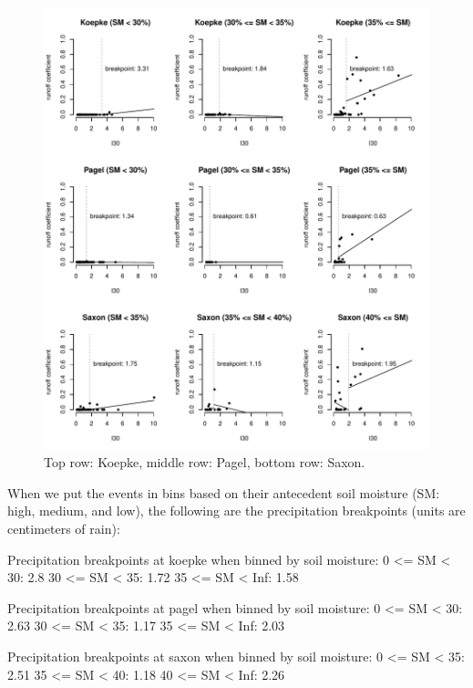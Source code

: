 \documentclass[12pt]{article}
\begin{document}
\begin{figure}
    \begin{center}
\includegraphics{runoff-I30_binned}
    \end{center}
    \caption{Top row: Koepke, middle row: Pagel, bottom row: Saxon.\label{I30_binned}}
\end{figure}


When we put the events in bins based on their antecedent soil moisture (SM: high, medium, and low), the following are the precipitation breakpoints (units are centimeters of rain):\\

\begin{Schunk}
\begin{Soutput}
Precipitation breakpoints at koepke when binned by soil moisture:
0 <= SM < 30: 2.8
30 <= SM < 35: 1.72
35 <= SM < Inf: 1.58

Precipitation breakpoints at pagel when binned by soil moisture:
0 <= SM < 30: 2.63
30 <= SM < 35: 1.17
35 <= SM < Inf: 2.03

Precipitation breakpoints at saxon when binned by soil moisture:
0 <= SM < 35: 2.51
35 <= SM < 40: 1.18
40 <= SM < Inf: 2.26
\end{Soutput}
\end{Schunk}
\end{document}
